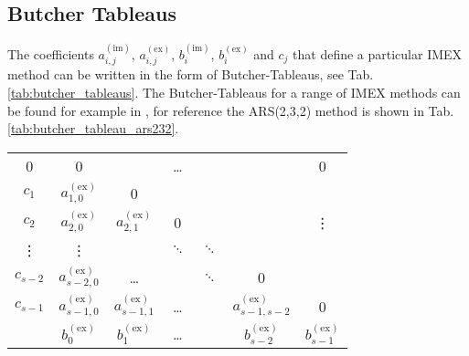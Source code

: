\documentclass[11pt]{article}
\newcommand{\impl}{{(\text{im})}}
\newcommand{\expl}{{(\text{ex})}}
\begin{document}
\subsection{Butcher Tableaus}\label{sec:butcher_tableaus}
The coefficients $a_{i,j}^\impl$, $a_{i,j}^\expl$, $b_{i}^\impl$, $b_{i}^\expl$ and $c_j$ that define a particular IMEX method can be written in the form of Butcher-Tableaus, see Tab. \ref{tab:butcher_tableaus}. The Butcher-Tableaus for a range of IMEX methods can be found for example in \cite{Weller2013}, for reference the ARS(2,3,2) method is shown in Tab. \ref{tab:butcher_tableau_ars232}.
\begin{table}
    \begin{minipage}{0.45\linewidth}
        \begin{center}
            \begin{tabular}{c|cccccc}
                0         & 0                 &                   & \dots    &          &                     & 0               \\
                $c_1$     & $a_{1,0}^\expl$   & 0                                                                               \\
                $c_2$     & $a_{2,0}^\expl$   & $a_{2,1}^\expl$   & 0        &          &                     & \vdots          \\
                \vdots    & \vdots            &                   & $\ddots$ & $\ddots$                                         \\
                $c_{s-2}$ & $a_{s-2,0}^\expl$ & \dots             &          & $\ddots$ & 0                                     \\
                $c_{s-1}$ & $a_{s-1,0}^\expl$ & $a_{s-1,1}^\expl$ & \dots    &          & $a_{s-1,s-2}^\expl$ & 0               \\
                \hline
                          & $b_0^\expl$       & $b_1^\expl$       & \dots    &          & $b_{s-2}^\expl$     & $b_{s-1}^\expl$ \\
            \end{tabular}
        \end{center}
    \end{minipage}
    \hfill
    \begin{minipage}{0.45\linewidth}
        \begin{center}
            \begin{tabular}{|cccccc}

\end{tabular}
\end{center}
\end{minipage}
\end{table}
\end{document}
